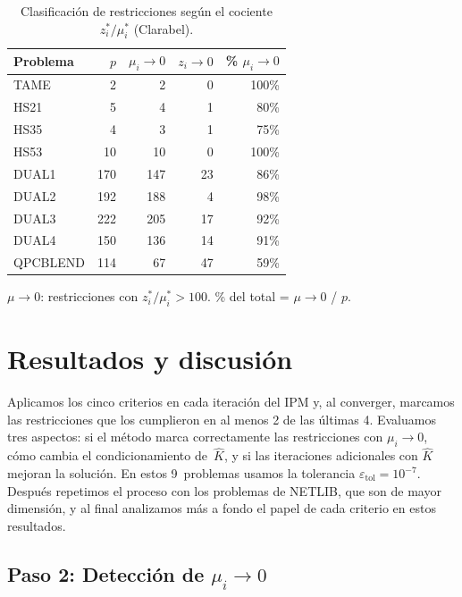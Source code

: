 \begin{table}[H]
\centering
\caption{Clasificación de restricciones según el cociente $z_i^*/\mu_i^*$ (Clarabel).}
\label{tab:clarabel_classification}
\begin{tabular}{l r r r r}
\toprule
Problema & $p$ & $\mu_i\to0$ & $z_i\to0$ & \% $\mu_i\to0$ \\
\midrule
TAME     &   2 &   2 &   0 & 100\% \\
HS21     &   5 &   4 &   1 &  80\% \\
HS35     &   4 &   3 &   1 &  75\% \\
HS53     &  10 &  10 &   0 & 100\% \\
DUAL1    & 170 & 147 &  23 &  86\% \\
DUAL2    & 192 & 188 &   4 &  98\% \\
DUAL3    & 222 & 205 &  17 &  92\% \\
DUAL4    & 150 & 136 &  14 &  91\% \\
QPCBLEND & 114 &  67 &  47 &  59\% \\
\bottomrule
\end{tabular}

\vspace{0.3em}
\footnotesize
$\mu\to0$: restricciones con $z_i^*/\mu_i^* > 100$. \% del total = $\mu\to0$ / $p$.
\end{table}

\section*{Resultados y discusión}

Aplicamos los cinco criterios en cada iteración del IPM y, al converger, marcamos las restricciones que los cumplieron en al menos 2 de las últimas 4.
Evaluamos tres aspectos: si el método marca correctamente las restricciones con $\mu_i \to 0$, cómo cambia el condicionamiento de~$\widehat{K}$, y si las iteraciones adicionales con $\widehat{K}$ mejoran la solución. En estos 9~problemas usamos la tolerancia $\varepsilon_{\text{tol}} = 10^{-7}$.
Después repetimos el proceso con los problemas de NETLIB, que son de mayor dimensión, y al final analizamos más a fondo el papel de cada criterio en estos resultados.

\subsection*{Paso 2: Detección de $\mu_i \to 0$}

